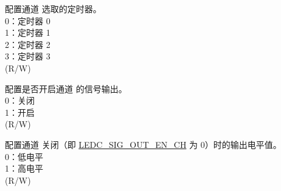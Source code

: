 %
%
%
%
%
%
%
%
\regnewline%
\begin{regdesc}\begin{reglist}
\label{fielddesc:LEDCTIMERSELCHN}\item [LEDC\_TIMER\_SEL\_CH\regindex{n}] 配置通道  选取的定时器。\\
0：定时器 0\\
1：定时器 1\\
2：定时器 2\\
3：定时器 3 \\
(R/W)
\label{fielddesc:LEDCSIGOUTENCHN}\item [LEDC\_SIG\_OUT\_EN\_CH\regindex{n}] 配置是否开启通道  的信号输出。\\
0：关闭\\
1：开启 \\
(R/W)
\label{fielddesc:LEDCIDLELVCHN}\item [LEDC\_IDLE\_LV\_CH\regindex{n}] 配置通道  关闭（即 \hyperref[fielddesc:LEDCSIGOUTENCHN]{LEDC\_SIG\_OUT\_EN\_CH} 为 0）时的输出电平值。\\
0：低电平\\
1：高电平 \\
(R/W)


\end{reglist}
\end{regdesc}
